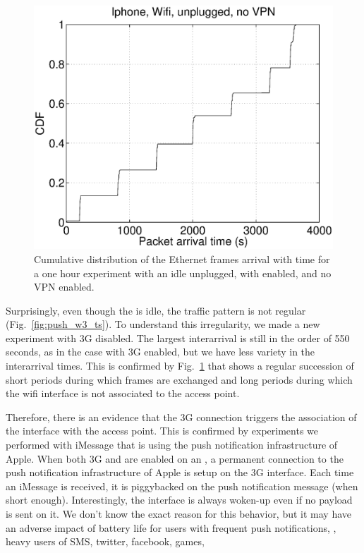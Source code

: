 
\begin{figure}
\centering
        \includegraphics[width=0.8\linewidth]{../../code/pushNotification/Fig/bw_iphone_wifi_unplug_novpn_ts.eps}
  \caption{Cumulative distribution of the Ethernet frames
          arrival with time for a one hour experiment with an idle
          \iphone{} unplugged, with \wifi{} enabled, and no VPN
          enabled.}
  \label{fig:push_w_ts}
\end{figure}

Surprisingly, even though the \iphone{} is idle, the traffic pattern
is not regular (Fig.~\ref{fig:push_w3_ts}). To
understand this irregularity, we made a new experiment with 3G
disabled. The largest
interarrival is still in the order of 550 seconds, as in the case with
3G enabled, but we have less variety in the interarrival times. This
is confirmed by Fig.~\ref{fig:push_w_ts} that shows a regular
succession of short periods during which frames are exchanged and long
periods during which the wifi interface is not associated to the
access point.

Therefore, there is an evidence that the 3G connection triggers
the association of the \iphone{} \wifi interface with the access
point. This is confirmed by experiments we performed with iMessage
that is using the push notification infrastructure of Apple. When both
3G and \wifi{} are enabled on an \iphone{}, a permanent connection to
the push notification infrastructure of Apple is setup on the 3G
interface. Each time an iMessage is received, it is piggybacked on the
push notification message (when short enough). Interestingly, the \wifi{}
interface is always woken-up even if no payload is sent on it. We
don't know the exact reason for this behavior, but it may have an
adverse impact of battery life for users with frequent push
notifications, \eg, heavy users of SMS, twitter, facebook, games, \etc

